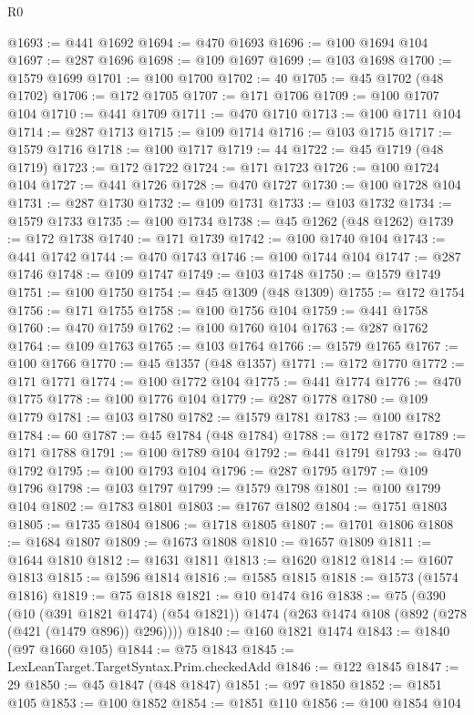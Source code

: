 \begin{lexlean}{R0}
\begin{coremodule}
@1693 := @441 @1692
@1694 := @470 @1693
@1696 := @100 @1694 @104
@1697 := @287 @1696
@1698 := @109 @1697
@1699 := @103 @1698
@1700 := @1579 @1699
@1701 := @100 @1700
@1702 := 40
@1705 := @45 @1702 (@48 @1702)
@1706 := @172 @1705
@1707 := @171 @1706
@1709 := @100 @1707 @104
@1710 := @441 @1709
@1711 := @470 @1710
@1713 := @100 @1711 @104
@1714 := @287 @1713
@1715 := @109 @1714
@1716 := @103 @1715
@1717 := @1579 @1716
@1718 := @100 @1717
@1719 := 44
@1722 := @45 @1719 (@48 @1719)
@1723 := @172 @1722
@1724 := @171 @1723
@1726 := @100 @1724 @104
@1727 := @441 @1726
@1728 := @470 @1727
@1730 := @100 @1728 @104
@1731 := @287 @1730
@1732 := @109 @1731
@1733 := @103 @1732
@1734 := @1579 @1733
@1735 := @100 @1734
@1738 := @45 @1262 (@48 @1262)
@1739 := @172 @1738
@1740 := @171 @1739
@1742 := @100 @1740 @104
@1743 := @441 @1742
@1744 := @470 @1743
@1746 := @100 @1744 @104
@1747 := @287 @1746
@1748 := @109 @1747
@1749 := @103 @1748
@1750 := @1579 @1749
@1751 := @100 @1750
@1754 := @45 @1309 (@48 @1309)
@1755 := @172 @1754
@1756 := @171 @1755
@1758 := @100 @1756 @104
@1759 := @441 @1758
@1760 := @470 @1759
@1762 := @100 @1760 @104
@1763 := @287 @1762
@1764 := @109 @1763
@1765 := @103 @1764
@1766 := @1579 @1765
@1767 := @100 @1766
@1770 := @45 @1357 (@48 @1357)
@1771 := @172 @1770
@1772 := @171 @1771
@1774 := @100 @1772 @104
@1775 := @441 @1774
@1776 := @470 @1775
@1778 := @100 @1776 @104
@1779 := @287 @1778
@1780 := @109 @1779
@1781 := @103 @1780
@1782 := @1579 @1781
@1783 := @100 @1782
@1784 := 60
@1787 := @45 @1784 (@48 @1784)
@1788 := @172 @1787
@1789 := @171 @1788
@1791 := @100 @1789 @104
@1792 := @441 @1791
@1793 := @470 @1792
@1795 := @100 @1793 @104
@1796 := @287 @1795
@1797 := @109 @1796
@1798 := @103 @1797
@1799 := @1579 @1798
@1801 := @100 @1799 @104
@1802 := @1783 @1801
@1803 := @1767 @1802
@1804 := @1751 @1803
@1805 := @1735 @1804
@1806 := @1718 @1805
@1807 := @1701 @1806
@1808 := @1684 @1807
@1809 := @1673 @1808
@1810 := @1657 @1809
@1811 := @1644 @1810
@1812 := @1631 @1811
@1813 := @1620 @1812
@1814 := @1607 @1813
@1815 := @1596 @1814
@1816 := @1585 @1815
@1818 := @1573 (@1574 @1816)
@1819 := @75 @1818
@1821 := @10 @1474 @16
@1838 := @75
    (@390
      (@10 (@391 @1821 @1474) (@54 @1821))
      @1474
      (@263 @1474 @108 (@892 (@278 (@421 (@1479 @896)) @296))))
@1840 := @160 @1821 @1474
@1843 := @1840 (@97 @1660 @105)
@1844 := @75 @1843
@1845 := LexLeanTarget.TargetSyntax.Prim.checkedAdd
@1846 := @122 @1845
@1847 := 29
@1850 := @45 @1847 (@48 @1847)
@1851 := @97 @1850
@1852 := @1851 @105
@1853 := @100 @1852
@1854 := @1851 @110
@1856 := @100 @1854 @104

\end{coremodule}
\end{lexlean}
